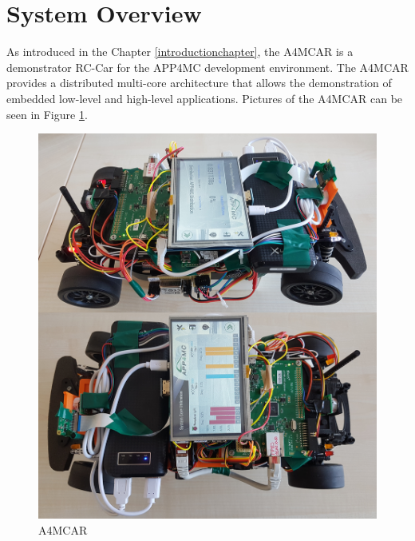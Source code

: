 \section{System Overview}
As introduced in the Chapter \ref{introductionchapter}, the A4MCAR is a demonstrator RC-Car for the APP4MC development environment. The A4MCAR provides a distributed multi-core architecture that allows the demonstration of embedded low-level and high-level applications. Pictures of the A4MCAR can be seen in Figure \ref{fig:a4mcar}.
\begin{figure}[!ht]
	\centering
	\captionsetup{justification=centering}
	\includegraphics[scale=0.4]{content/images/a4mcar.png}
	\caption{A4MCAR}
	\label{fig:a4mcar}
\end{figure}
